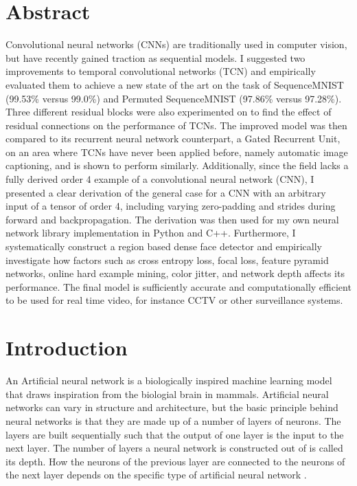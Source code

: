 \documentclass[a4paper, twoside]{article}
\begin{document}
\newpage

\section*{Abstract}
\normalsize{}
Convolutional neural networks (CNNs) are traditionally used in computer vision, but have recently gained traction as sequential models. I suggested two improvements to temporal convolutional networks (TCN) and empirically evaluated them to achieve a new state of the art on the task of SequenceMNIST (99.53\% versus 99.0\%) and Permuted SequenceMNIST (97.86\% versus 97.28\%). Three different residual blocks were also experimented on to find the effect of residual connections on the performance of TCNs. The improved model was then compared to its recurrent neural network counterpart, a Gated Recurrent Unit, on an area where TCNs have never been applied before, namely automatic image captioning, and is shown to perform similarly. Additionally, since the field lacks a fully derived order 4 example of a convolutional neural network (CNN), I presented a clear derivation of the general case for a CNN with an arbitrary input of a tensor of order 4, including varying zero-padding and strides during forward and backpropagation. The derivation was then used for my own neural network library implementation in Python and C++. Furthermore, I systematically construct a region based dense face detector and empirically investigate how factors such as cross entropy loss, focal loss, feature pyramid networks, online hard example mining, color jitter, and network depth affects its performance. The final model is sufficiently accurate and computationally efficient to be used for real time video, for instance CCTV or other surveillance systems.

\newpage

\tableofcontents
\newpage
\section{Introduction}

An Artificial neural network is a biologically inspired machine learning model that draws inspiration from the biologial brain in mammals. Artificial neural networks can vary in structure and architecture, but the basic principle behind neural networks is that they are made up of a number of layers of neurons. The layers are built sequentially such that the output of one layer is the input to the next layer. The number of layers a neural network is constructed out of is called its depth. How the neurons of the previous layer are connected to the neurons of the next layer depends on the specific type of artificial neural network \cite{cs231n}.
\end{document}
